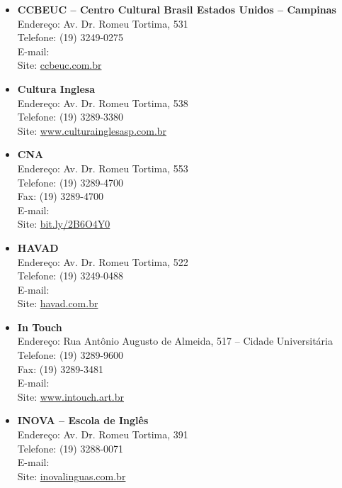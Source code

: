 \begin{itemize}
\item \textbf{CCBEUC -- Centro Cultural Brasil Estados Unidos -- Campinas}
  \\Endereço: Av. Dr. Romeu Tortima, 531
  \\Telefone: (19) 3249-0275
  \\E-mail: 
  \\Site: \url{ccbeuc.com.br}

\item \textbf{Cultura Inglesa}
  \\Endereço: Av. Dr. Romeu Tortima, 538
  \\Telefone: (19) 3289-3380
  \\Site: \url{www.culturainglesasp.com.br}

\item \textbf{CNA}
  \\Endereço: Av. Dr. Romeu Tortima, 553
  \\Telefone: (19) 3289-4700
  \\Fax: (19) 3289-4700
  \\E-mail: 
  \\Site: \url{bit.ly/2B6O4Y0}

\item \textbf{HAVAD}
  \\Endereço: Av. Dr. Romeu Tortima, 522
  \\Telefone: (19) 3249-0488
  \\E-mail: 
  \\Site: \url{havad.com.br}

\item \textbf{In Touch}
  \\Endereço: Rua Antônio Augusto de Almeida, 517 -- Cidade Universitária
  \\Telefone: (19) 3289-9600
  \\Fax: (19) 3289-3481
  \\E-mail: 
  \\Site: \url{www.intouch.art.br}

\item \textbf{INOVA -- Escola de Inglês}
  \\Endereço: Av. Dr. Romeu Tortima, 391
  \\Telefone: (19) 3288-0071
  \\E-mail: 
  \\Site: \url{inovalinguas.com.br}


\end{itemize}
